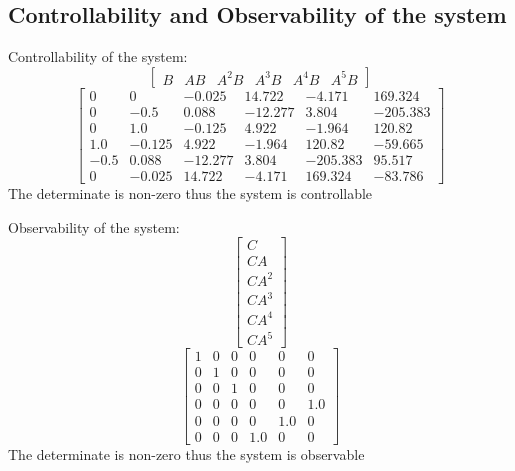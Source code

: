 \subsection{Controllability and Observability of the system}
Controllability of the system:
\begin{equation}
  \begin{bmatrix}
    B & AB & A^2B & A^3B & A^4B & A^5B
  \end{bmatrix}
\end{equation}
\begin{equation}
\left[\begin{matrix}0 & 0 & -0.025 & 14.722 & -4.171 & 169.324\\0 & -0.5 & 0.088 & -12.277 & 3.804 & -205.383\\0 & 1.0 & -0.125 & 4.922 & -1.964 & 120.82\\1.0 & -0.125 & 4.922 & -1.964 & 120.82 & -59.665\\-0.5 & 0.088 & -12.277 & 3.804 & -205.383 & 95.517\\0 & -0.025 & 14.722 & -4.171 & 169.324 & -83.786\end{matrix}\right]
\end{equation}
The determinate is non-zero thus the system is controllable

Observability of the system:
\begin{equation}
  \begin{bmatrix}
    C \\ CA \\ CA^2 \\ CA^3 \\ CA^4 \\ CA^5
  \end{bmatrix}
\end{equation}
\begin{equation}
\left[\begin{matrix}1 & 0 & 0 & 0 & 0 & 0\\0 & 1 & 0 & 0 & 0 & 0\\0 & 0 & 1 & 0 & 0 & 0\\0 & 0 & 0 & 0 & 0 & 1.0\\0 & 0 & 0 & 0 & 1.0 & 0\\0 & 0 & 0 & 1.0 & 0 & 0\end{matrix}\right]
\end{equation}
The determinate is non-zero thus the system is observable

